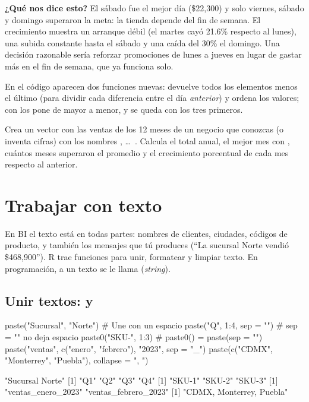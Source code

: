 \textbf{¿Qué nos dice esto?} El sábado fue el mejor día (\$22,300) y solo
viernes, sábado y domingo superaron la meta: la tienda depende del fin de
semana. El crecimiento muestra un arranque débil (el martes cayó 21.6\%
respecto al lunes), una subida constante hasta el sábado y una caída del
30\% el domingo. Una decisión razonable sería reforzar promociones de
lunes a jueves en lugar de gastar más en el fin de semana, que ya funciona
solo.

En el código aparecen dos funciones nuevas:  devuelve
todos los elementos menos el último (para dividir cada diferencia entre el
día \emph{anterior}) y  ordena los valores; con
 los pone de mayor a menor, y \codigo{[1:3]} se
queda con los tres primeros.

\begin{hazlotu}
Crea un vector con las ventas de los 12 meses de un negocio que conozcas (o
inventa cifras) con los nombres , \ldots\
. Calcula el total anual, el mejor mes con
, cuántos meses superaron el promedio y el
crecimiento porcentual de cada mes respecto al anterior.
\end{hazlotu}

\section{Trabajar con texto}
\label{sec:m1-texto}

En BI el texto está en todas partes: nombres de clientes, ciudades, códigos
de producto, y también los mensajes que tú produces (``La sucursal Norte
vendió \$468,900''). R trae funciones para unir, formatear y limpiar texto.
En programación, a un texto se le llama \termino{cadena} (\emph{string}).

\subsection{Unir textos: \texorpdfstring{}{paste()} y \texorpdfstring{}{paste0()}}

\begin{rcode}
paste("Sucursal", "Norte")               # Une con un espacio
paste("Q", 1:4, sep = "")                # sep = "" no deja espacio
paste0("SKU-", 1:3)                      # paste0() = paste(sep = "")
paste("ventas", c("enero", "febrero"), "2023", sep = "_")
paste(c("CDMX", "Monterrey", "Puebla"), collapse = ", ")
\end{rcode}
\begin{rsalida}
[1] "Sucursal Norte"
[1] "Q1" "Q2" "Q3" "Q4"
[1] "SKU-1" "SKU-2" "SKU-3"
[1] "ventas_enero_2023"   "ventas_febrero_2023"
[1] "CDMX, Monterrey, Puebla"
\end{rsalida}

